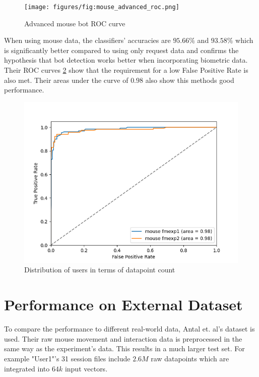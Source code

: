 \documentclass[
    fontsize=12pt,
    headings=small,
    parskip=half,           %
    bibliography=totoc,
    numbers=noenddot,       %
    open=any,               %
    final,                   %
    table
]{scrreprt}
\begin{document}
\begin{figure}[h]
    \texttt{[image: figures/fig:mouse\_advanced\_roc.png]}
    \caption{Advanced mouse bot ROC curve}
    \label{fig:mouse_advanced_roc}
\end{figure}


When using mouse data, the classifiers' accuracies are $95.66\%$ and $93.58\%$ which is significantly better compared to using only request data and confirms the hypothesis that bot detection works better when incorporating biometric data. Their ROC curves \ref{fig:roc_mouse_both_instances} show that the requirement for a low False Positive Rate is also met. Their areas under the curve of $0.98$ also show this methods good performance.

\begin{figure}[h]
    \includegraphics[width=\textwidth]{figures/roc_mouse_both_instances.png}
    \caption{Distribution of users in terms of datapoint count}
    \label{fig:roc_mouse_both_instances}
\end{figure}

\section{Performance on External Dataset}


To compare the performance to different real-world data, Antal et. al's dataset \cite{9111596} is used. Their raw mouse movement and interaction data is preprocessed in the same way as the experiment's data. This results in a much larger test set. For example "User1"'s 31 session files include $2.6M$ raw datapoints which are integrated into $64k$ input vectors.
\end{document}

